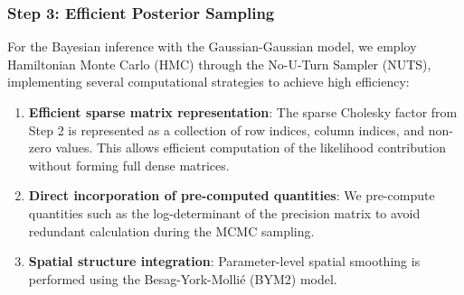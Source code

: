 \subsubsection{Step 3: Efficient Posterior Sampling}
For the Bayesian inference with the Gaussian-Gaussian model, we employ Hamiltonian Monte Carlo (HMC) through the No-U-Turn Sampler (NUTS), implementing several computational strategies to achieve high efficiency:

\begin{enumerate}
    \item \textbf{Efficient sparse matrix representation}: The sparse Cholesky factor from Step 2 is represented as a collection of row indices, column indices, and non-zero values. This allows efficient computation of the likelihood contribution without forming full dense matrices.
    
    \item \textbf{Direct incorporation of pre-computed quantities}: We pre-compute quantities such as the log-determinant of the precision matrix to avoid redundant calculation during the MCMC sampling.
    
    \item \textbf{Spatial structure integration}: Parameter-level spatial smoothing is performed using the Besag-York-Mollié (BYM2) model.
\end{enumerate}